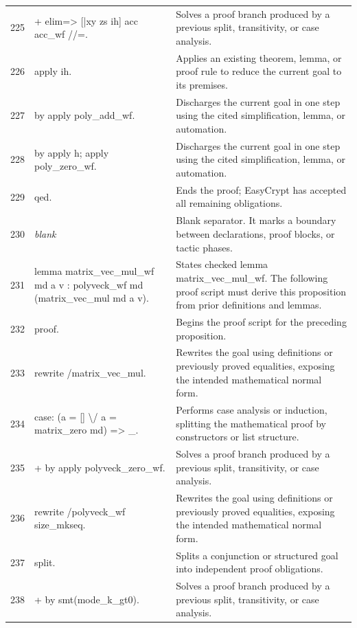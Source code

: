 \documentclass[10pt]{article}
\begin{document}
\begin{longtable}{r L{0.53\textwidth} L{0.37\textwidth}}
225 & {\ttfamily\scriptsize + elim=> [|xy zs ih] acc acc\_wf //=.} & Solves a proof branch produced by a previous split, transitivity, or case analysis. \\
226 & {\ttfamily\scriptsize   apply ih.} & Applies an existing theorem, lemma, or proof rule to reduce the current goal to its premises. \\
227 & {\ttfamily\scriptsize   by apply poly\_add\_wf.} & Discharges the current goal in one step using the cited simplification, lemma, or automation. \\
228 & {\ttfamily\scriptsize by apply h; apply poly\_zero\_wf.} & Discharges the current goal in one step using the cited simplification, lemma, or automation. \\
229 & {\ttfamily\scriptsize qed.} & Ends the proof; EasyCrypt has accepted all remaining obligations. \\
230 & {\ttfamily\scriptsize \emph{blank}} & Blank separator.  It marks a boundary between declarations, proof blocks, or tactic phases. \\
231 & {\ttfamily\scriptsize lemma matrix\_vec\_mul\_wf md a v : polyveck\_wf md (matrix\_vec\_mul md a v).} & States checked lemma matrix\_vec\_mul\_wf.  The following proof script must derive this proposition from prior definitions and lemmas. \\
232 & {\ttfamily\scriptsize proof.} & Begins the proof script for the preceding proposition. \\
233 & {\ttfamily\scriptsize rewrite /matrix\_vec\_mul.} & Rewrites the goal using definitions or previously proved equalities, exposing the intended mathematical normal form. \\
234 & {\ttfamily\scriptsize case: (a = [] \textbackslash{}/ a = matrix\_zero md) => \_.} & Performs case analysis or induction, splitting the mathematical proof by constructors or list structure. \\
235 & {\ttfamily\scriptsize + by apply polyveck\_zero\_wf.} & Solves a proof branch produced by a previous split, transitivity, or case analysis. \\
236 & {\ttfamily\scriptsize rewrite /polyveck\_wf size\_mkseq.} & Rewrites the goal using definitions or previously proved equalities, exposing the intended mathematical normal form. \\
237 & {\ttfamily\scriptsize split.} & Splits a conjunction or structured goal into independent proof obligations. \\
238 & {\ttfamily\scriptsize + by smt(mode\_k\_gt0).} & Solves a proof branch produced by a previous split, transitivity, or case analysis. \\

\end{longtable}
\end{document}
